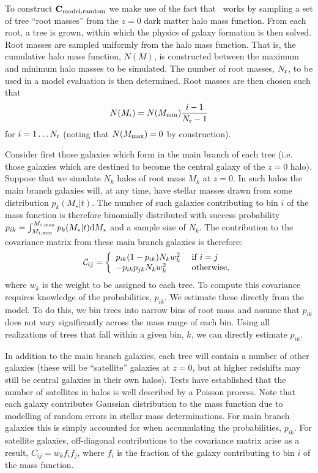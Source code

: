 To construct ${\bf C}_{\rm model,random}$ we make use of the fact that \glc\ works by sampling a set of tree ``root masses'' from the $z=0$ dark matter halo mass function. From each root, a tree is grown, within which the physics of galaxy formation is then solved. Root masses are sampled uniformly from the halo mass function. That is, the cumulative halo mass function, $N(M)$, is constructed between the maximum and minimum halo masses to be simulated. The number of root masses, $N_{\rm r}$, to be used in a model evaluation is then determined. Root masses are then chosen such that
\begin{equation}
 N(M_i) = N(M_{\rm min}) {i-1 \over N_{\rm r}-1}
\end{equation}
for $i=1\ldots N_{\rm r}$ (noting that $N(M_{\rm max})=0$ by construction). 

Consider first those galaxies which form in the main branch of each tree (i.e. those galaxies which are destined to become the central galaxy of the $z=0$ halo). Suppose that we simulate $N_k$ halos of root mass $M_k$ at $z=0$. In such halos the main branch galaxies will, at any time, have stellar masses drawn from some distribution $p_k(M_\star|t)$. The number of such galaxies contributing to bin $i$ of the mass function is therefore binomially distributed with success probability $p_{ik} = \int_{M_{i,\rm min}}^{M_{i,\rm max}} p_k(M_\star|t) \d M_\star$ and a sample size of $N_k$. The contribution to the covariance matrix from these main branch galaxies is therefore:
\begin{equation}
 \mathcal{C}_{ij} = \left\{ \begin{array}{ll} p_{ik}(1-p_{ik}) N_k w_k^2 & \hbox{ if } i = j \\ -p_{ik} p_{jk} N_k w_k^2 & \hbox{ otherwise,} \end{array} \right.
\end{equation}
where $w_k$ is the weight to be assigned to each tree. To compute this covariance requires knowledge of the probabilities, $p_{ik}$. We estimate these directly from the model. To do this, we bin trees into narrow bins of root mass and assume that $p_{ik}$ does not vary significantly across the mass range of each bin. Using all realizations of trees that fall within a given bin, $k$, we can directly estimate $p_{ik}$.

In addition to the main branch galaxies, each tree will contain a number of other galaxies (these will be ``satellite'' galaxies at $z=0$, but at higher redshifts may still be central galaxies in their own halos). Tests have established that the number of satellites in halos is well described by a Poisson process. Note that each galaxy contributes Gaussian distribution to the mass function due to modelling of random errors in stellar mass determinations. For main branch galaxies this is simply accounted for when accumulating the probabilities, $p_{ik}$. For satellite galaxies, off-diagonal contributions to the covariance matrix arise as a result, $C_{ij} = w_k f_i f_j$, where $f_i$ is the fraction of the galaxy contributing to bin $i$ of the mass function.

